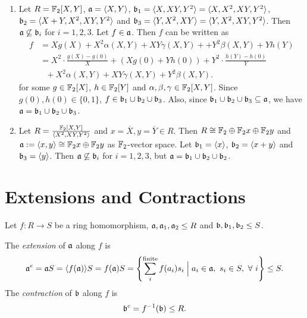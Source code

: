 \begin{example}\label{1.60}
    \begin{enumerate}
        \item Let $R = \mathbb{F}_2[X,Y]$, $\mathfrak{a} = \langle X,Y \rangle$, $\mathfrak{b}_1 = \langle X,XY,Y^2 \rangle = \langle X,X^2,XY,Y^2 \rangle$, $\mathfrak{b}_2 = \langle X+Y,X^2,XY,Y^2 \rangle$ and $\mathfrak{b}_3 = \langle Y,X^2,XY \rangle = \langle Y,X^2,XY,Y^2 \rangle$. Then $\mathfrak{a} \not \subseteq \mathfrak{b}_i$ for $i = 1,2,3$. Let $f \in \mathfrak{a}$. Then $f$ can be written as 
            \begin{align*}
                f &= X g(X) + X^2\alpha(X,Y) + XY\gamma(X,Y) + +Y^2\beta(X,Y) + Yh(Y) \\
                  &= X^2 \cdot \frac{g(X)-g(0)}{X} + (Xg(0)+Yh(0)) + Y^2 \cdot \frac{h(Y)-h(0)}{Y} \\
                  &\ \ \ + X^2\alpha(X,Y) + XY\gamma(X,Y) + Y^2\beta(X,Y).
            \end{align*}
            for some $g \in \mathbb{F}_2[X]$, $h \in \mathbb{F}_2[Y]$ and $\alpha,\beta,\gamma \in \mathbb{F}_2[X,Y]$. Since $g(0), h(0) \in \{0,1\}$, $f \in \mathfrak{b}_1 \cup \mathfrak{b}_2 \cup \mathfrak{b}_3$. Also, since $\mathfrak{b}_1 \cup \mathfrak{b}_2 \cup \mathfrak{b}_3 \subseteq \mathfrak{a}$, we have $\mathfrak{a} = \mathfrak{b}_1 \cup \mathfrak{b}_2 \cup \mathfrak{b}_3$.
        \item Let $R = \frac{\mathbb{F}_2[X,Y]}{\langle X^2,XY,Y^2 \rangle}$ and $x = \overbar{X}, y = \overbar{Y} \in R$. Then $R \cong \mathbb{F}_2 \oplus \mathbb{F}_2x \oplus \mathbb{F}_2y$ and $\mathfrak{a} := \langle x,y \rangle \cong \mathbb{F}_2x \oplus \mathbb{F}_2y$ as $\mathbb{F}_2$-vector space. Let $\mathfrak{b}_1 = \langle x \rangle$, $\mathfrak{b}_2 = \langle x + y \rangle$ and $\mathfrak{b}_3 = \langle y \rangle$. Then $\mathfrak{a} \not \subseteq \mathfrak{b}_i$ for $i = 1,2,3$, but $\mathfrak{a} = \mathfrak{b}_1 \cup \mathfrak{b}_2 \cup \mathfrak{b}_2$.
    \end{enumerate}
\end{example}

\section*{Extensions and Contractions}

Let $f: R \to S$ be a ring homomorphism, $\mathfrak{a},\mathfrak{a}_1,\mathfrak{a}_2 \leq R$ and $\mathfrak{b},\mathfrak{b}_1,\mathfrak{b}_2 \leq S$. 

\begin{definition}\label{1.61}
    The \emph{extension} of $\mathfrak{a}$ along $f$ is 
    \[\mathfrak{a}^e = \mathfrak{a} S = \langle f(\mathfrak{a}) \rangle S  = f(\mathfrak{a})S = \left\{\sum_i^{\text{finite}} f(a_i)s_i \mathrel{\Big |} a_i \in \mathfrak{a},\ s_i \in S, \ \forall \  i \right\} \leq S.\]
    The \emph{contraction} of $\mathfrak{b}$ along $f$ is 
    \[\mathfrak{b}^c = f^{-1}(\mathfrak{b}) \leq R.\]
\end{definition}

